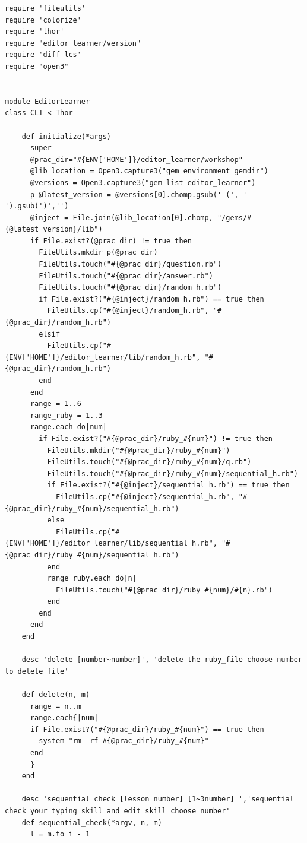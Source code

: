 \documentclass[11pt,dvipdfmx]{jsarticle}
\begin{document}
    \begin{verbatim}
require 'fileutils'
require 'colorize'
require 'thor'
require "editor_learner/version"
require 'diff-lcs'
require "open3"


module EditorLearner
class CLI < Thor

    def initialize(*args)
      super
      @prac_dir="#{ENV['HOME']}/editor_learner/workshop"
      @lib_location = Open3.capture3("gem environment gemdir")
      @versions = Open3.capture3("gem list editor_learner")
      p @latest_version = @versions[0].chomp.gsub(' (', '-').gsub(')','')
      @inject = File.join(@lib_location[0].chomp, "/gems/#{@latest_version}/lib")
      if File.exist?(@prac_dir) != true then
        FileUtils.mkdir_p(@prac_dir)
        FileUtils.touch("#{@prac_dir}/question.rb")
        FileUtils.touch("#{@prac_dir}/answer.rb")
        FileUtils.touch("#{@prac_dir}/random_h.rb")
        if File.exist?("#{@inject}/random_h.rb") == true then
          FileUtils.cp("#{@inject}/random_h.rb", "#{@prac_dir}/random_h.rb")
        elsif  
          FileUtils.cp("#{ENV['HOME']}/editor_learner/lib/random_h.rb", "#{@prac_dir}/random_h.rb")
        end
      end
      range = 1..6
      range_ruby = 1..3
      range.each do|num|
        if File.exist?("#{@prac_dir}/ruby_#{num}") != true then
          FileUtils.mkdir("#{@prac_dir}/ruby_#{num}")
          FileUtils.touch("#{@prac_dir}/ruby_#{num}/q.rb")
          FileUtils.touch("#{@prac_dir}/ruby_#{num}/sequential_h.rb")
          if File.exist?("#{@inject}/sequential_h.rb") == true then
            FileUtils.cp("#{@inject}/sequential_h.rb", "#{@prac_dir}/ruby_#{num}/sequential_h.rb")
          else
            FileUtils.cp("#{ENV['HOME']}/editor_learner/lib/sequential_h.rb", "#{@prac_dir}/ruby_#{num}/sequential_h.rb")
          end
          range_ruby.each do|n|
            FileUtils.touch("#{@prac_dir}/ruby_#{num}/#{n}.rb")
          end
        end
      end
    end
    
    desc 'delete [number~number]', 'delete the ruby_file choose number to delete file'
    
    def delete(n, m)
      range = n..m
      range.each{|num|
      if File.exist?("#{@prac_dir}/ruby_#{num}") == true then
        system "rm -rf #{@prac_dir}/ruby_#{num}"
      end
      }
    end

    desc 'sequential_check [lesson_number] [1~3number] ','sequential check your typing skill and edit skill choose number'
    def sequential_check(*argv, n, m)
      l = m.to_i - 1
     

\end{verbatim}
\end{document}
